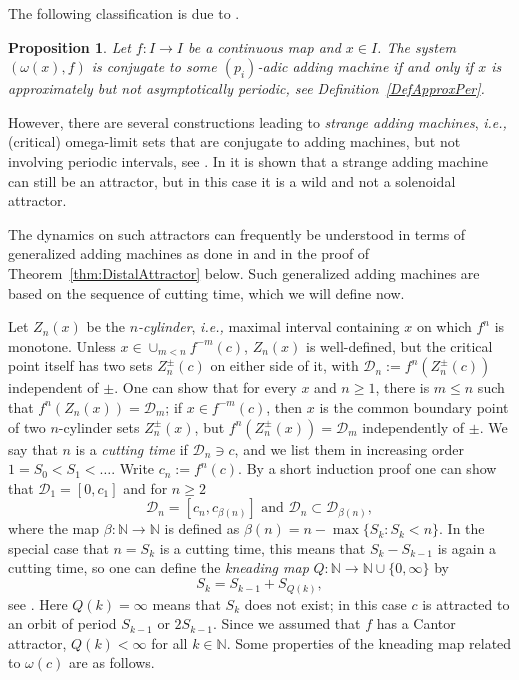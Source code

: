 \documentclass[12pt, psamsfonts, reqno]{amsart}
\newtheorem{proposition}[theorem]{Proposition}
\begin{document}
The following classification is due to \cite[Proposition 5.1]{BrJi}.

\begin{proposition}\label{PropApproxPer}
Let $f:I\to I$ be a continuous map and $x\in I$. The
system $(\omega(x),f)$ is conjugate to some $(p_i)$-adic adding
machine if and only if $x$ is approximately but not
asymptotically periodic, see Definition~\ref{DefApproxPer}.
\end{proposition}

However, there are several constructions leading to {\em strange
adding machines}, {{\em i.e., }} (critical) omega-limit sets that are
conjugate to adding machines, but not involving periodic intervals,
see \cite{BKM, BrJi, Btree}. In \cite{Btree} it is shown that a
strange adding machine can still be an attractor, but in this case
it is a wild and not a solenoidal attractor.

The dynamics on such attractors can frequently be understood in
terms of generalized adding machines as done in \cite{BKS} and in the
proof of Theorem~\ref{thm:DistalAttractor} below. Such generalized adding
machines are based on the sequence of cutting time, which we will define now.

Let $Z_n(x)$ be the \emph{$n$-cylinder}, {{\em i.e., }} maximal interval
containing $x$ on which $f^n$ is monotone. Unless $x \in \cup_{m <
n} f^{-m}(c)$, $Z_n(x)$ is well-defined, but the critical point itself has two
sets $Z_n^{\pm}(c)$ on either side of it, with ${{\mathcal D}}_n :=
f^n(Z_n^\pm(c))$ independent of $\pm$.
One can show that for
every $x$ and $n \geq 1$, there is $m \leq n$ such that $f^n(Z_n(x)) =
{{\mathcal D}}_m$; if $x \in f^{-m}(c)$, then $x$ is the common boundary point of two
$n$-cylinder sets $Z_n^\pm(x)$, but
$f^n(Z_n^\pm(x)) = {{\mathcal D}}_m$ independently of $\pm$.
We say that $n$ is a {\em cutting time} if ${{\mathcal D}}_n \owns c$,
and we list them in increasing order $1 = S_0 < S_1 < \dots$.
Write $c_n := f^n(c)$. By a short induction proof one can show
that ${{\mathcal D}}_1 = [0,c_1]$ and for $n \geq 2$
\begin{equation}\label{eq:beta}
{{\mathcal D}}_n = [c_n, c_{\beta(n)}] \text{ and } {{\mathcal D}}_n \subset
{{\mathcal D}}_{\beta(n)},
\end{equation}
where the map $\beta:{{\mathbb N}} \to {{\mathbb N}}$ is defined as $\beta(n) = n -
\max \{ S_k : S_k < n\}$. In the special case that $n = S_k$ is a
cutting time, this means that $S_k - S_{k-1}$ is again a cutting
time, so one can define the {\em kneading map} $Q: {{\mathbb N}} \to {{\mathbb N}} \cup
\{ 0, \infty \}$ by
\[
S_k = S_{k-1} + S_{Q(k)},
\]
see \cite{hofbauer, Bknead}.
Here $Q(k) = \infty$ means that $S_k$ does not exist; in this case $c$ is attracted to an orbit of period $S_{k-1}$ or $2S_{k-1}$.
Since we assumed that $f$ has a Cantor attractor, $Q(k) < \infty$
for all $k \in {{\mathbb N}}$.
Some properties of the kneading map related to $\omega(c)$ are as follows.
\end{document}
